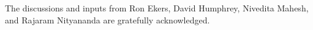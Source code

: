 \documentclass[
  journal=pasa,
  manuscript=article-type,
  year=2020,
  volume=37,
]{cup-journal}
\begin{document}




\begin{acknowledgement}
The discussions and inputs from Ron Ekers, David Humphrey, Nivedita Mahesh, and Rajaram Nityananda are gratefully acknowledged. 
\end{acknowledgement}





\end{document}
